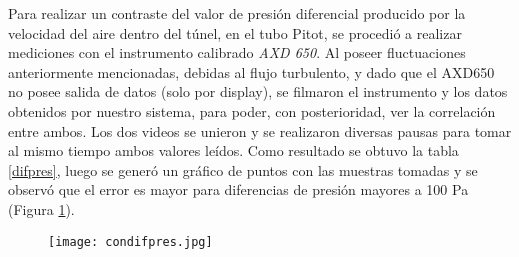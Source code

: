 Para realizar un contraste del valor de presión diferencial producido por la velocidad del aire dentro del túnel, en el tubo Pitot, se procedió a realizar mediciones con el instrumento calibrado \textit{AXD 650}. Al poseer fluctuaciones anteriormente mencionadas, debidas al flujo turbulento, y dado que el AXD650 no posee salida de datos (solo por display), se filmaron el instrumento y los datos obtenidos por nuestro sistema, para poder, con posterioridad, ver la correlación entre ambos. Los dos videos se unieron y se realizaron diversas pausas para tomar al mismo tiempo ambos valores leídos. Como resultado se obtuvo la tabla \ref{difpres}, luego se generó un gráfico de puntos con las muestras tomadas y se observó que el error es mayor para diferencias de presión mayores a 100 Pa (Figura \ref{fig:condifpres}).

\begin{figure}[H]
	\centering
	\texttt{[image: condifpres.jpg]}
	\label{fig:condifpres}
\end{figure}

